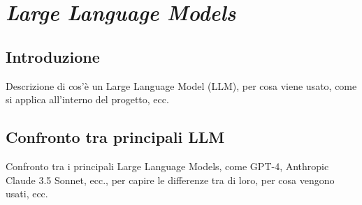 \section{\textit{Large Language Models}}
\label{sez:llm}

\subsection{Introduzione}
\label{subsec:llm-introduzione}

Descrizione di cos'è un Large Language Model (LLM), per cosa viene usato, come si applica all'interno del progetto, ecc.

\subsection{Confronto tra principali LLM}
\label{subsec:llm-confronto}

Confronto tra i principali Large Language Models, come GPT-4, Anthropic Claude 3.5 Sonnet, ecc., per capire le differenze tra di loro, per cosa vengono usati, ecc.